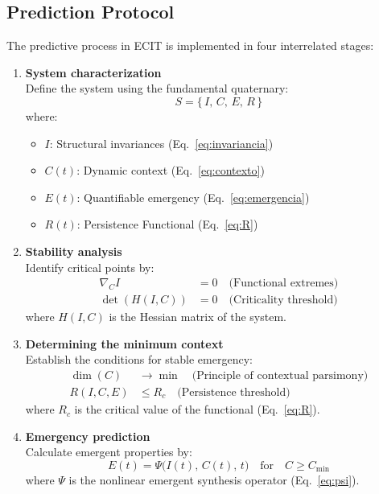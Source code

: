 \documentclass{article}
\begin{document}
\subsection{Prediction Protocol}\label{sec:protocolo}
The predictive process in ECIT is implemented in four interrelated stages:

\begin{enumerate}[leftmargin=*,label=\textbf{Step \arabic{enumi}.},series=protocolo]
    \item \textbf{System characterization} \\    Define the system using the fundamental quaternary:
    \begin{equation}\label{eq:S}
        S = \{\,I,\, C,\, E,\, R\,\}
    \end{equation}
    where:
    \begin{itemize}[nosep]
        \item $I$: Structural invariances (Eq.~\ref{eq:invariancia})
        \item $C(t)$: Dynamic context (Eq.~\ref{eq:contexto})
        \item $E(t)$: Quantifiable emergency (Eq.~\ref{eq:emergencia})
        \item $R(t)$: Persistence Functional (Eq.~\ref{eq:R})
    \end{itemize}

    \item \textbf{Stability analysis} \\
    Identify critical points by:
    \begin{align}
        \nabla_C I &= 0 \quad \text{(Functional extremes)}\label{eq:estabilidad1} \\
        \det(H(I,C)) &= 0 \quad \text{(Criticality threshold)}\label{eq:estabilidad2}
    \end{align}
    where $H(I,C)$ is the Hessian matrix of the system.

    \item \textbf{Determining the minimum context} \\
    Establish the conditions for stable emergency:
    \begin{align}
        \dim(C) &\to \min \quad \text{(Principle of contextual parsimony)}\label{eq:Cmin1} \\
        R(I,C,E) &\leq R_c \quad \text{(Persistence threshold)}\label{eq:Cmin2}
    \end{align}
    where $R_c$ is the critical value of the functional (Eq.~\ref{eq:R}).

    \item \textbf{Emergency prediction} \\
    Calculate emergent properties by:
    \begin{equation}\label{eq:prediccion}
        E(t) = \Psi\big(I(t),\, C(t),\, t\big) \quad \text{for} \quad C \geq C_{\text{min}}
    \end{equation}
    where $\Psi$ is the nonlinear emergent synthesis operator (Eq.~\ref{eq:psi}).
\end{enumerate}
\end{document}
